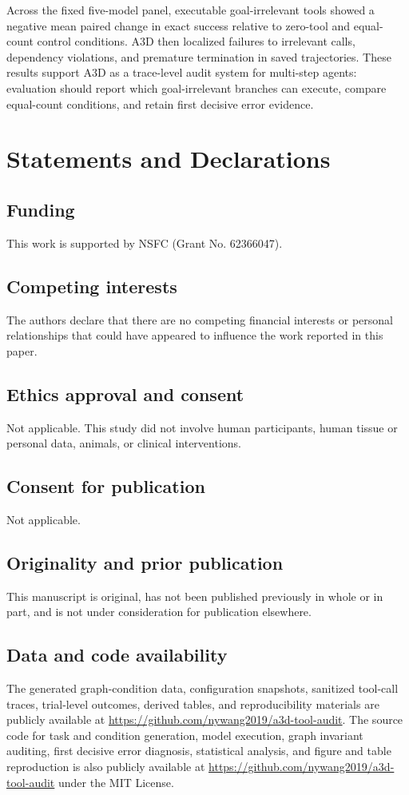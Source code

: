 \documentclass[pdflatex,sn-basic]{sn-jnl}
\begin{document}
Across the fixed five-model panel, executable goal-irrelevant tools showed a
negative mean paired change in exact success relative to zero-tool and
equal-count control conditions. A3D then
localized failures to irrelevant calls, dependency violations, and premature
termination in saved trajectories. These results support A3D as a trace-level
audit system for multi-step agents: evaluation should report which goal-irrelevant
branches can execute, compare equal-count conditions, and retain first decisive
error evidence.

\section*{Statements and Declarations}

\subsection*{Funding}
This work is supported by NSFC (Grant No. 62366047).

\subsection*{Competing interests}
The authors declare that there are no competing financial interests or
personal relationships that could have appeared to influence the work reported
in this paper.

\subsection*{Ethics approval and consent}
Not applicable. This study did not involve human participants, human tissue or personal data,
animals, or clinical interventions.

\subsection*{Consent for publication}
Not applicable.

\subsection*{Originality and prior publication}
This manuscript is original, has not been published previously in whole or in
part, and is not under consideration for publication elsewhere.

\subsection*{Data and code availability}
The generated graph-condition data, configuration snapshots, sanitized
tool-call traces, trial-level outcomes, derived tables, and reproducibility
materials are publicly available at
\url{https://github.com/nywang2019/a3d-tool-audit}. The source code for task and condition generation, model execution, graph
invariant auditing, first decisive error diagnosis, statistical analysis, and figure and
table reproduction is also publicly available at
\url{https://github.com/nywang2019/a3d-tool-audit} under the MIT License.
\end{document}
